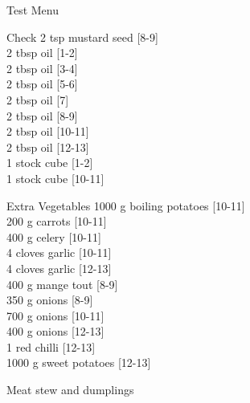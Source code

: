 \begin{menu}{Test Menu}
\begin{shoppinglist}{Check}
      2 tsp mustard seed 
        {\scriptsize[8-9]}\\
      2 tbsp oil 
        {\scriptsize[1-2]}\\
      2 tbsp oil 
        {\scriptsize[3-4]}\\
      2 tbsp oil 
        {\scriptsize[5-6]}\\
      2 tbsp oil 
        {\scriptsize[7]}\\
      2 tbsp oil 
        {\scriptsize[8-9]}\\
      2 tbsp oil 
        {\scriptsize[10-11]}\\
      2 tbsp oil 
        {\scriptsize[12-13]}\\
      1  stock cube 
        {\scriptsize[1-2]}\\
      1  stock cube 
        {\scriptsize[10-11]}\\
      \end{shoppinglist}%
      \begin{shoppinglist}{Extra Vegetables}
      1000 g boiling potatoes 
        {\scriptsize[10-11]}\\
      200 g carrots 
        {\scriptsize[10-11]}\\
      400 g celery 
        {\scriptsize[10-11]}\\
      4 cloves garlic 
        {\scriptsize[10-11]}\\
      4 cloves garlic 
        {\scriptsize[12-13]}\\
      400 g mange tout 
        {\scriptsize[8-9]}\\
      350 g onions 
        {\scriptsize[8-9]}\\
      700 g onions 
        {\scriptsize[10-11]}\\
      400 g onions 
        {\scriptsize[12-13]}\\
      1  red chilli 
        {\scriptsize[12-13]}\\
      1000 g sweet potatoes 
        {\scriptsize[12-13]}\\
      \end{shoppinglist}%
      \par\vfil %
    \vfil\clearpage
  
    \begin{recipe}{2}{Meat stew and dumplings}%
    

\end{recipe}
\end{menu}

